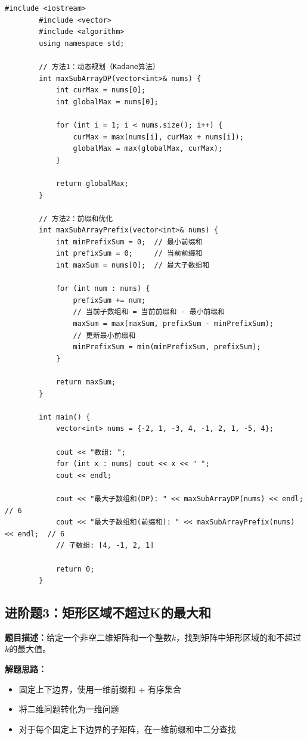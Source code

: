 \documentclass[12pt,a4paper]{article}
\begin{document}
	\begin{lstlisting}[caption={进阶题2：最大子数组和 - 前缀和优化}]
		#include <iostream>
		#include <vector>
		#include <algorithm>
		using namespace std;
		
		// 方法1：动态规划（Kadane算法）
		int maxSubArrayDP(vector<int>& nums) {
			int curMax = nums[0];
			int globalMax = nums[0];
			
			for (int i = 1; i < nums.size(); i++) {
				curMax = max(nums[i], curMax + nums[i]);
				globalMax = max(globalMax, curMax);
			}
			
			return globalMax;
		}
		
		// 方法2：前缀和优化
		int maxSubArrayPrefix(vector<int>& nums) {
			int minPrefixSum = 0;  // 最小前缀和
			int prefixSum = 0;     // 当前前缀和
			int maxSum = nums[0];  // 最大子数组和
			
			for (int num : nums) {
				prefixSum += num;
				// 当前子数组和 = 当前前缀和 - 最小前缀和
				maxSum = max(maxSum, prefixSum - minPrefixSum);
				// 更新最小前缀和
				minPrefixSum = min(minPrefixSum, prefixSum);
			}
			
			return maxSum;
		}
		
		int main() {
			vector<int> nums = {-2, 1, -3, 4, -1, 2, 1, -5, 4};
			
			cout << "数组: ";
			for (int x : nums) cout << x << " ";
			cout << endl;
			
			cout << "最大子数组和(DP): " << maxSubArrayDP(nums) << endl;  // 6
			cout << "最大子数组和(前缀和): " << maxSubArrayPrefix(nums) << endl;  // 6
			// 子数组: [4, -1, 2, 1]
			
			return 0;
		}
	\end{lstlisting}
	
	\subsection{进阶题3：矩形区域不超过K的最大和}
	
	\textbf{题目描述：}给定一个非空二维矩阵和一个整数$k$，找到矩阵中矩形区域的和不超过$k$的最大值。
	
	\textbf{解题思路：}
	\begin{itemize}
		\item 固定上下边界，使用一维前缀和 + 有序集合
		\item 将二维问题转化为一维问题
		\item 对于每个固定上下边界的子矩阵，在一维前缀和中二分查找
	\end{itemize}
	
\end{document}
